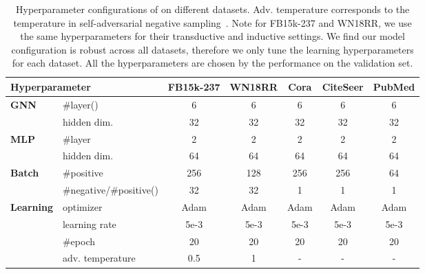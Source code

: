 \begin{table}[!h]
    \centering
    \caption{Hyperparameter configurations of \method on different datasets. Adv. temperature corresponds to the temperature in self-adversarial negative sampling~\cite{sun2019rotate}. Note for FB15k-237 and WN18RR, we use the same hyperparameters for their transductive and inductive settings. We find our model configuration is robust across all datasets, therefore we only tune the learning hyperparameters for each dataset. All the hyperparameters are chosen by the performance on the validation set.}
    \label{tab:hyperparameter}
    \begin{adjustbox}{max width=\textwidth}
        \begin{tabular}{llccccc}
            \toprule
            \multicolumn{2}{l}{\bf{Hyperparameter}}
                                 & \bf{FB15k-237} & \bf{WN18RR} & \bf{Cora} & \bf{CiteSeer} & \bf{PubMed} \\
            \midrule
            \multirow{2}{*}{\bf{GNN}}
                                 & \#layer() & 6         & 6      & 6    & 6        & 6      \\
                                 & hidden dim.  & 32        & 32     & 32   & 32       & 32     \\
            \midrule
            \multirow{2}{*}{\bf{MLP}}
                                 & \#layer     & 2         & 2      & 2    & 2        & 2      \\
                                 & hidden dim. & 64        & 64     & 64   & 64       & 64    \\
            \midrule
            \multirow{2}{*}{\bf{Batch}}
                                 & \#positive  & 256       & 128    & 256  & 256    & 64     \\
                                 & \#negative/\#positive() & 32     & 32   & 1      & 1     & 1      \\
            \midrule
            \multirow{4}{*}{\bf{Learning}}
                                 & optimizer     & Adam   & Adam   & Adam   & Adam   & Adam    \\
                                 & learning rate & 5e-3   & 5e-3   & 5e-3   & 5e-3   & 5e-3    \\
                                 & \#epoch       & 20     & 20     & 20     & 20     & 20      \\
                                 & adv. temperature & 0.5 & 1      & -      & -      & -       \\
            \bottomrule
        \end{tabular}
    \end{adjustbox}
\end{table}

